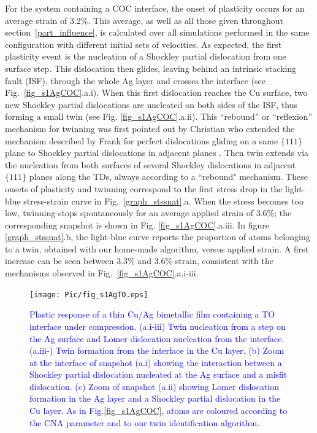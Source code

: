 \documentclass[final,3p,times,twocolumn]{elsarticle}
\begin{document}
For the system containing a COC interface, the onset of plasticity occurs for an average strain of 3.2\%. This average, as well as all those given throughout section~\ref{part_influence}, is calculated  over all simulations performed in the same configuration with different initial sets of velocities. As expected, the first plasticity event is the nucleation of a Shockley partial dislocation from one surface step. This dislocation then glides, leaving behind an intrinsic stacking fault (ISF), through the whole Ag layer and crosses the interface (see Fig.~\ref{fig_s1AgCOC}.a.i). When this first dislocation reaches the Cu surface, two new Shockley partial dislocations are nucleated on both sides of the ISF, thus forming a small twin (see Fig. \ref{fig_s1AgCOC}.a.ii). This ``rebound'' or ``reflexion'' mechanism for twinning was first pointed out by Christian who extended the mechanism described by Frank for perfect dislocations gliding on a same $\lbrace111\rbrace$ plane \cite{hirth82book} to Shockley partial dislocations in adjacent planes \cite{christian51PRS}. Then twin extends via the nucleation from both surfaces of several Shockley dislocations in adjacent $\lbrace111\rbrace$  planes along the TDs, always according to a ``rebound" mechanism. These onsets of plasticity and twinning correspond to the first stress drop in the light-blue stress-strain curve in Fig.~\ref{graph_stssnat}.a. When the stress becomes too low, twinning stops spontaneously for an average applied strain of 3.6\%; the corresponding snapshot is shown in Fig. \ref{fig_s1AgCOC}.a.iii. In figure \ref{graph_stssnat}.b, the light-blue curve reports the proportion of atoms belonging to a twin, obtained with our home-made algorithm, versus applied strain. A first increase can be seen between 3.3\% and 3.6\% strain, consistent with the mechanisms observed in Fig.~\ref{fig_s1AgCOC}.a.i-iii. 

\begin{figure}[!t]
	\begin{center}
		\texttt{[image: Pic/fig\_s1AgTO.eps]} 
	\end{center}
	\caption{\textcolor{blue}{Plastic response of a thin Cu/Ag bimetallic film containing a TO interface under compression. (a.i-iii) Twin nucleation from a step on the Ag surface and Lomer dislocation nucleation from the interface. (a.iii-) Twin formation from the interface in the Cu layer. (b) Zoom at the interface of snapshot (a.i) showing the interaction between a Shockley partial dislocation nucleated at the Ag surface and a misfit dislocation. (c) Zoom of snapshot (a.ii) showing Lomer dislocation formation in the Ag layer and a Shockley partial dislocation in the Cu layer. As in Fig.\ref{fig_s1AgCOC}, atoms are coloured according to the CNA parameter and to our twin identification algorithm.}}\label{fig_s1AgTO}
\end{figure}
\end{document}
